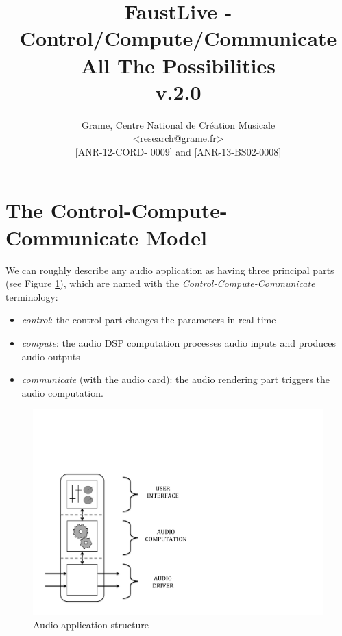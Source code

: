 \documentclass[a4paper]{article}
\begin{document}
\title{FaustLive - Control/Compute/Communicate \\ All The Possibilities\\ v.2.0}

\author{Grame, Centre National de Création Musicale\\
{\small <research@grame.fr>} \\
\vspace{2mm}
[ANR-12-CORD- 0009] and [ANR-13-BS02-0008]
}

\maketitle


\vspace{\fill}

\vspace{\fill}
\newpage
\tableofcontents

\newpage
\section{The Control-Compute-Communicate Model}

 We can roughly describe any audio application as having three principal parts (see Figure {\ref{fig:structure}}), which are named with the  {\it Control-Compute-Communicate}  terminology:

\begin{itemize}

\item {\it control}: the control part changes the parameters in real-time  

\item  {\it compute}: the audio DSP computation processes audio inputs and produces audio outputs  

\item {\it communicate}   (with the audio card):  the audio rendering part triggers the audio computation.  

\end{itemize}

\begin{figure}[!ht]
\begin{center}
\includegraphics[width=0.75\columnwidth]{images/2-Faust_Construction}
\caption{Audio application structure}
\label{fig:structure}
\end{center}
\end{figure}
\end{document}
